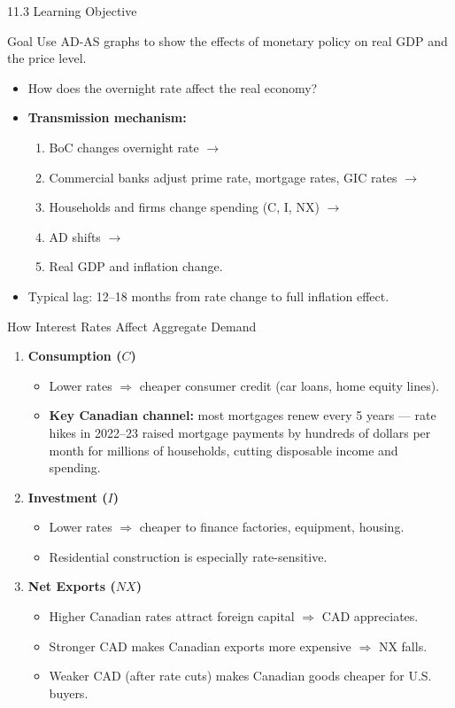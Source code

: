\documentclass[aspectratio=169]{beamer}
\begin{document}
\begin{frame}{11.3 Learning Objective}
\transfade
\begin{block}{Goal}
Use AD-AS graphs to show the effects of monetary policy on real GDP and the price level.
\end{block}
\begin{itemize}
  \item How does the overnight rate affect the real economy?
  \item \textbf{Transmission mechanism:}
  \begin{enumerate}
    \item BoC changes overnight rate $\rightarrow$
    \item Commercial banks adjust prime rate, mortgage rates, GIC rates $\rightarrow$
    \item Households and firms change spending (C, I, NX) $\rightarrow$
    \item AD shifts $\rightarrow$
    \item Real GDP and inflation change.
  \end{enumerate}
  \item Typical lag: \alert{12--18 months} from rate change to full inflation effect.
\end{itemize}
\end{frame}

\begin{frame}{How Interest Rates Affect Aggregate Demand}
\transfade
\begin{enumerate}
  \item \textbf{Consumption ($C$)}
  \begin{itemize}
    \item Lower rates $\Rightarrow$ cheaper consumer credit (car loans, home equity lines).
    \item \textbf{Key Canadian channel:} most mortgages renew every 5 years --- rate hikes in 2022--23 raised mortgage payments by hundreds of dollars per month for millions of households, cutting disposable income and spending.
  \end{itemize}
  \item \textbf{Investment ($I$)}
  \begin{itemize}
    \item Lower rates $\Rightarrow$ cheaper to finance factories, equipment, housing.
    \item Residential construction is especially rate-sensitive.
  \end{itemize}
  \item \textbf{Net Exports ($NX$)}
  \begin{itemize}
    \item Higher Canadian rates attract foreign capital $\Rightarrow$ CAD appreciates.
    \item Stronger CAD makes Canadian exports more expensive $\Rightarrow$ NX falls.
    \item Weaker CAD (after rate cuts) makes Canadian goods cheaper for U.S. buyers.
  \end{itemize}
\end{enumerate}
\end{frame}
\end{document}
